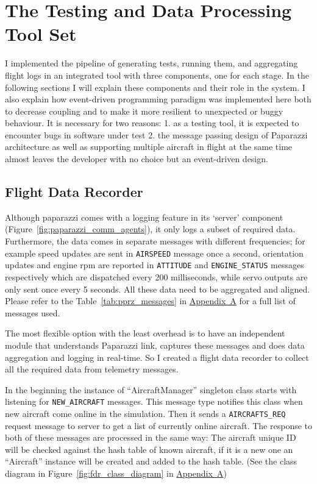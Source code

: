 \section{The Testing and Data Processing Tool Set}
I implemented the pipeline of generating tests, running them, and aggregating flight logs in an integrated tool with three components, one for each stage. In the following sections I will explain these components and their role in the system. I also explain how event-driven programming paradigm was implemented here both to decrease coupling and to make it more resilient to unexpected or buggy behaviour. It is necessary for two reasons: 1. as a testing tool, it is expected to encounter bugs in software under test 2. the message passing design of Paparazzi architecture as well as supporting multiple aircraft in flight at the same time almost leaves the developer with no choice but an event-driven design.


\subsection{Flight Data Recorder}
Although paparazzi comes with a logging feature in its `server' component (Figure~\ref{fig:paparazzi_comm_agents}), it only logs a subset of required data. Furthermore, the data comes in separate messages with different frequencies; for example speed updates are sent in \verb|AIRSPEED| message once a second, orientation updates and engine rpm are reported in \verb|ATTITUDE| and \verb|ENGINE_STATUS| messages respectively which are dispatched every 200 milliseconds, while servo outputs are only sent once every 5 seconds. All these data need to be aggregated and aligned. Please refer to the Table~\ref{tab:pprz_messages} in \hyperref[appendixa]{Appendix~A} for a full list of messages used.

The most flexible option with the least overhead is to have an independent module that understands Paparazzi link, captures these messages and does data aggregation and logging in real-time. So I created a flight data recorder to collect all the required data from telemetry messages.

In the beginning the instance of ``AircraftManager'' singleton class starts with listening for \verb|NEW_AIRCRAFT| messages. This message type notifies this class when new aircraft come online in the simulation. Then it sends a \verb|AIRCRAFTS_REQ| request message to server to get a list of currently online aircraft. The response to both of these messages are processed in the same way: The aircraft unique ID will be checked against the hash table of known aircraft, if it is a new one an ``Aircraft'' instance will be created and added to the hash table. (See the class diagram in Figure~\ref{fig:fdr_class_diagram} in \hyperref[appendixa]{Appendix~A})

